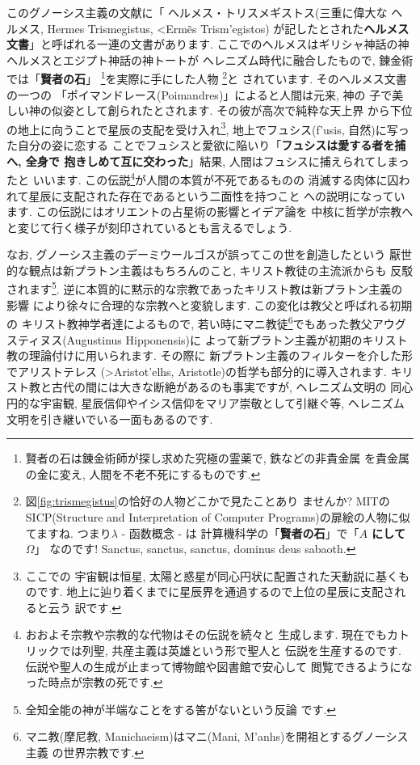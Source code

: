 \documentclass[b5j,8pt,twocolumn]{ltjsarticle}
\newcommand{\textgreek}[1]{\begingroup\fontencoding{LGR}\selectfont#1\endgroup}
\begin{document}
このグノーシス主義の文献に「 ヘルメス・トリスメギストス(三重に偉大な
ヘルメス, Hermes Trismegistus, \textgreek{<Erm\~es Trism'egistos})
が記したとされた\textbf{ヘルメス文書}」と呼ばれる一連の文書があります.
 ここでのヘルメスはギリシャ神話の神ヘルメスとエジプト神話の神トートが
ヘレニズム時代に融合したもので, 錬金術では「\textbf{賢者の石}」
\footnote{賢者の石は錬金術師が探し求めた究極の霊薬で, 鉄などの非貴金属
を貴金属の金に変え, 人間を不老不死にするものです.}を実際に手にした人物
\footnote{図\ref{fig:trismegistus}の恰好の人物どこかで見たことあり
ませんか? MITのSICP(Structure and Interpretation of Computer
 Programs)の扉絵の人物に似てますね. つまり$\lambda$ - 函数概念 - は
計算機科学の「\textbf{賢者の石}」で「\textbf{$A$ にして $\Omega$}」
なのです! Sanctus, sanctus, sanctus, dominus deus sabaoth.}と
されています\cite{錬金術}. そのヘルメス文書の一つの
「ポイマンドレース(Poimandres)」\cite{柴田}によると人間は元来, 神の
子で美しい神の似姿として創られたとされます. その彼が高次で純粋な天上界
から下位の地上に向うことで星辰の支配を受け入れ\footnote{ここでの
宇宙観は恒星, 太陽と惑星が同心円状に配置された天動説に基くものです.
 地上に辿り着くまでに星辰界を通過するので上位の星辰に支配されると云う
訳です.}, 地上でフュシス(\textgreek{f'usis}, 自然)に写った自分の姿に恋する
ことでフュシスと愛欲に陥いり「\textbf{フュシスは愛する者を捕へ, 全身で
抱きしめて互に交わった}」結果, 人間はフュシスに捕えられてしまったと
いいます. この伝説\footnote{おおよそ宗教や宗教的な代物はその伝説を続々と
生成します. 現在でもカトリックでは列聖, 共産主義は英雄という形で聖人と
伝説を生産するのです. 伝説や聖人の生成が止まって博物館や図書館で安心して
閲覧できるようになった時点が宗教の死です.}が人間の本質が不死であるものの
消滅する肉体に囚われて星辰に支配された存在であるという二面性を持つこと
への説明になっています. この伝説にはオリエントの占星術の影響とイデア論を
中核に哲学が宗教へと変じて行く様子が刻印されているとも言えるでしょう.
\newline

なお, グノーシス主義のデーミウールゴスが誤ってこの世を創造したという
厭世的な観点は新プラトン主義はもちろんのこと, キリスト教徒の主流派からも
反駁されます\footnote{全知全能の神が半端なことをする筈がないという反論
です.}. 逆に本質的に黙示的な宗教であったキリスト教は新プラトン主義の影響
により徐々に合理的な宗教へと変貌します. この変化は教父と呼ばれる初期の
キリスト教神学者達によるもので, 若い時にマニ教徒\footnote{マニ教(摩尼教,
 Manichaeism)はマニ(Mani, \textgreek{M'anhs})を開祖とするグノーシス主義
の世界宗教です.}でもあった教父アウグスティヌス(Augustinus Hipponensis)に
よって新プラトン主義が初期のキリスト教の理論付けに用いられます. その際に
新プラトン主義のフィルターを介した形でアリストテレス
(\textgreek{>Aristot'elhs}, Aristotle)の哲学も部分的に導入されます.
 キリスト教と古代の間には大きな断絶があるのも事実ですが, ヘレニズム文明の
同心円的な宇宙観, 星辰信仰やイシス信仰をマリア崇敬として引継ぐ等,
 ヘレニズム文明を引き継いでいる一面もあるのです.
\newline
\end{document}
